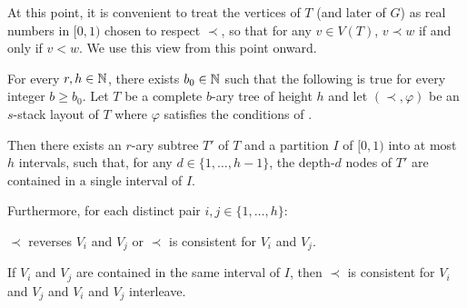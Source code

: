 \documentclass[kpfonts]{patmorin}
\begin{document}
At this point, it is convenient to treat the vertices of $T$ (and later of $G$) as real numbers in $[0,1)$ chosen to respect $\prec$, so that for any $v\in V(T)$, $v\prec w$ if and only if $v < w$.  We use this view from this point onward.

\begin{lem}
  For every $r,h\in\mathbb{N}$, there exists $b_0\in\mathbb{N}$ such that the following is true for every integer $b\ge b_0$.  Let $T$ be a complete $b$-ary tree of height $h$ and let $(\prec,\varphi)$ be an $s$-stack layout of $T$ where $\varphi$ satisfies the conditions of .  
  
  Then there exists an $r$-ary subtree $T'$ of $T$ and a partition $I$ of $[0,1)$ into at most $h$ intervals, such that, for any $d\in\{1,\ldots,h-1\}$, the depth-$d$ nodes of $T'$ are contained in a single interval of $I$.
  
  Furthermore, for each distinct pair $i,j\in\{1,\ldots,h\}$:
  \begin{compactenum}[(O1)]
    \item $\prec$ reverses $V_i$ and $V_j$ or $\prec$ is consistent for $V_i$ and $V_j$.
    \item If $V_i$ and $V_j$ are contained in the same interval of $I$, then $\prec$ is consistent for $V_i$ and $V_j$ and $V_i$ and $V_j$ interleave.
  \end{compactenum}
\end{lem}
\end{document}
